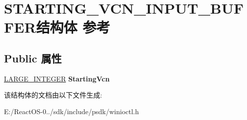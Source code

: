 \hypertarget{struct_s_t_a_r_t_i_n_g___v_c_n___i_n_p_u_t___b_u_f_f_e_r}{}\section{S\+T\+A\+R\+T\+I\+N\+G\+\_\+\+V\+C\+N\+\_\+\+I\+N\+P\+U\+T\+\_\+\+B\+U\+F\+F\+E\+R结构体 参考}
\label{struct_s_t_a_r_t_i_n_g___v_c_n___i_n_p_u_t___b_u_f_f_e_r}
\subsection*{Public 属性}
\begin{DoxyCompactItemize}
\item 
\mbox{\label{struct_s_t_a_r_t_i_n_g___v_c_n___i_n_p_u_t___b_u_f_f_e_r_a9d173d14480893a94c6b2b129045e423}} 
\hyperlink{union___l_a_r_g_e___i_n_t_e_g_e_r}{L\+A\+R\+G\+E\+\_\+\+I\+N\+T\+E\+G\+ER} {\bfseries Starting\+Vcn}
\end{DoxyCompactItemize}


该结构体的文档由以下文件生成\+:\begin{DoxyCompactItemize}
\item 
E\+:/\+React\+O\+S-\/0../sdk/include/psdk/winioctl.\+h\end{DoxyCompactItemize}
